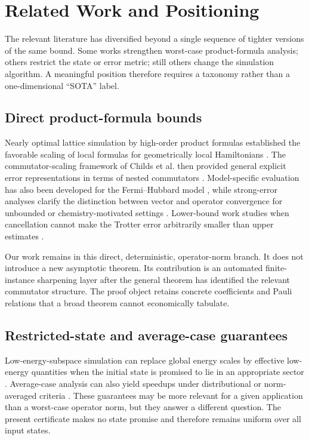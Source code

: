 \section{Related Work and Positioning}
\label{sec:related}

The relevant literature has diversified beyond a single sequence of tighter
versions of the same bound.  Some works strengthen worst-case product-formula
analysis; others restrict the state or error metric; still others change the
simulation algorithm.  A meaningful position therefore requires a taxonomy
rather than a one-dimensional ``SOTA'' label.

\subsection{Direct product-formula bounds}

Nearly optimal lattice simulation by high-order product formulas established
the favorable scaling of local formulas for geometrically local Hamiltonians
\citep{childs2019lattice}.  The commutator-scaling framework of Childs et al.
then provided general explicit error representations in terms of nested
commutators \citep{childs2021trotter}.  Model-specific evaluation has also
been developed for the Fermi--Hubbard model \citep{schubert2023hubbard}, while
strong-error analyses clarify the distinction between vector and operator
convergence for unbounded or chemistry-motivated settings
\citep{burgarth2024strong}.  Lower-bound work studies when cancellation cannot
make the Trotter error arbitrarily smaller than upper estimates
\citep{hahn2024lower}.

Our work remains in this direct, deterministic, operator-norm branch.  It does
not introduce a new asymptotic theorem.  Its contribution is an automated
finite-instance sharpening layer after the general theorem has identified the
relevant commutator structure.  The proof object retains concrete
coefficients and Pauli relations that a broad theorem cannot economically
tabulate.

\subsection{Restricted-state and average-case guarantees}

Low-energy-subspace simulation can replace global energy scales by effective
low-energy quantities when the initial state is promised to lie in an
appropriate sector \citep{sahinoglu2021lowenergy}.  Average-case analysis can
also yield speedups under distributional or norm-averaged criteria
\citep{chen2024average}.  These guarantees may be more relevant for a given
application than a worst-case operator norm, but they answer a different
question.  The present certificate makes no state promise and therefore
remains uniform over all input states.


